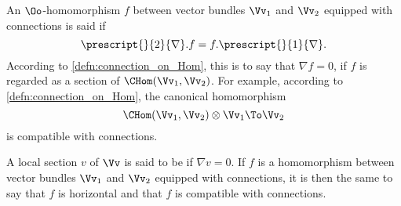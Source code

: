 \begin{para}
  An $\Oo$-homomorphism $f$ between vector bundles $\Vv_1$ and $\Vv_2$ equipped
  with connections is said  if
  \[
  \prescript{}{2}{\nabla}.f = f.\prescript{}{1}{\nabla}.
  \]
  According to \ref{defn:connection_on_Hom}, this is to say that $\nabla f =0$,
  if $f$ is regarded as a section of $\CHom(\Vv_1,\Vv_2)$.
  For example, according to \ref{defn:connection_on_Hom},
  the canonical homomorphism
  \[
  \CHom(\Vv_1,\Vv_2)\otimes\Vv_1\To\Vv_2
  \]
  is compatible with connections.
\end{para}

\begin{para}
  A local section $v$ of $\Vv$ is said to be  if
  $\nabla v=0$. If $f$ is a homomorphism between vector bundles $\Vv_1$ and
  $\Vv_2$ equipped with connections, it is then the same to say that $f$ is
  horizontal and that $f$ is compatible with connections.
\end{para}


